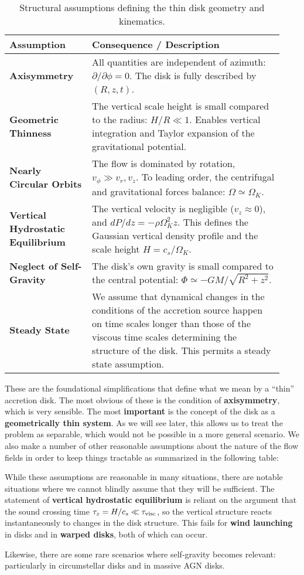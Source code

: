 \begin{table}[ht!]
\centering
\renewcommand{\arraystretch}{1.4}
\begin{tabular}{p{0.28\linewidth} p{0.65\linewidth}}
\toprule
\textbf{Assumption} & \textbf{Consequence / Description} \\
\midrule
\textbf{Axisymmetry} & All quantities are independent of azimuth: $\partial/\partial\phi = 0$.  The disk is fully described by $(R,z,t)$. \\[4pt]
\textbf{Geometric Thinness} & The vertical scale height is small compared to the radius: $H/R \ll 1$.  Enables vertical integration and Taylor expansion of the gravitational potential. \\[4pt]
\textbf{Nearly Circular Orbits} & The flow is dominated by rotation, $v_\phi \gg v_r, v_z$.  To leading order, the centrifugal and gravitational forces balance: $\Omega \simeq \Omega_K$. \\[4pt]
\textbf{Vertical Hydrostatic Equilibrium} & The vertical velocity is negligible ($v_z \approx 0$), and $dP/dz = -\rho \Omega_K^2 z$.  This defines the Gaussian vertical density profile and the scale height $H=c_s/\Omega_K$. \\[4pt]
\textbf{Neglect of Self-Gravity} & The disk’s own gravity is small compared to the central potential: $\Phi \simeq -GM/\sqrt{R^2+z^2}$. \\[4pt]
\bottomrule
 {\bf Steady State}&We assume that dynamical changes in the conditions of the accretion source happen on time scales longer than those of the viscous time scales determining the structure of the disk. This permits a steady state assumption.\\
\end{tabular}
\caption{Structural assumptions defining the thin disk geometry and kinematics.}
\end{table}

These are the foundational simplifications that define what we mean by a ``thin'' accretion disk. The most obvious of these is the condition of \textbf{axisymmetry}, which is very sensible. The most \textbf{important} is the concept of the disk as a \textbf{geometrically thin system}. As we will see later, this allows us to treat the problem as separable, which would not be possible in a more general scenario. We also make a number of other reasonable assumptions about the nature of the flow fields in order to keep things tractable as summarized in the following table:

While these assumptions are reasonable in many situations, there are notable situations where we cannot blindly assume that they will be sufficient. The statement of \textbf{vertical hydrostatic equilibrium} is reliant on the argument that the sound crossing time $\tau_{z} = H/c_s \ll \tau_{\rm visc}$, so the vertical structure reacts instantaneously to changes in the disk structure. This fails for \textbf{wind launching} in disks and in \textbf{warped disks}, both of which can occur.
\par
Likewise, there are some rare scenarios where self-gravity becomes relevant: particularly in circumstellar disks and in massive AGN disks.


